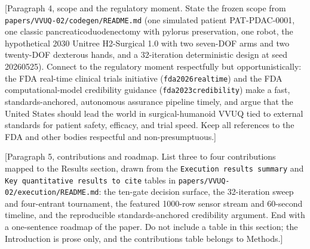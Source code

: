 [Paragraph 4, scope and the regulatory moment. State the frozen scope from
\texttt{papers/VVUQ-02/codegen/README.md} (one simulated patient PAT-PDAC-0001, one
classic pancreaticoduodenectomy with pylorus preservation, one robot, the
hypothetical 2030 Unitree H2-Surgical 1.0 with two seven-DOF arms and two
twenty-DOF dexterous hands, and a 32-iteration deterministic design at seed
20260525). Connect to the regulatory moment respectfully but opportunistically:
the FDA real-time clinical trials initiative (\texttt{fda2026realtime}) and the FDA
computational-model credibility guidance (\texttt{fda2023credibility}) make a fast,
standards-anchored, autonomous assurance pipeline timely, and argue that the United
States should lead the world in surgical-humanoid VVUQ tied to external standards
for patient safety, efficacy, and trial speed. Keep all references to the FDA and
other bodies respectful and non-presumptuous.]

[Paragraph 5, contributions and roadmap. List three to four contributions mapped
to the Results section, drawn from the \texttt{Execution results summary} and
\texttt{Key quantitative results to cite} tables in
\texttt{papers/VVUQ-02/execution/README.md}: the ten-gate decision surface, the
32-iteration sweep and four-entrant tournament, the featured 1000-row sensor stream
and 60-second timeline, and the reproducible standards-anchored credibility
argument. End with a one-sentence roadmap of the paper. Do not include a table in
this section; the Introduction is prose only, and the contributions table belongs
to Methods.]
